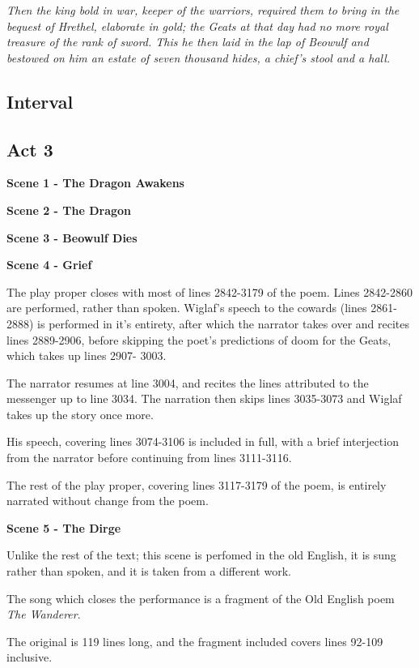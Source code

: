 \documentclass[a4paper]{article}
\begin{document}
{\textit{ Then the king bold in war, keeper of the warriors,
required them to bring in the bequest of Hrethel,
elaborate in gold; the Geats at that day
had no more royal treasure of the rank of sword.
This he then laid in the lap of Beowulf
and bestowed on him an estate of seven thousand hides,
a chief’s stool and a hall.}

\subsection{Interval}%

\subsection{Act 3}%

\centerline{\textbf{Scene 1 - The Dragon Awakens}}

\centerline{\textbf{Scene 2 - The Dragon}}

\centerline{\textbf{Scene 3 - Beowulf Dies}}

\centerline{\textbf{Scene 4 - Grief}}

The play proper closes with most of lines 2842-3179 of the poem.
Lines 2842-2860 are performed, rather than spoken.  
Wiglaf's speech to the cowards (lines 2861-2888) is performed in it's entirety, 
after which the narrator takes over and recites lines 2889-2906, before skipping 
the poet's predictions of doom for the Geats, which takes up lines 2907- 3003.

The narrator resumes at line 3004, and recites the lines attributed to the 
messenger up to line 3034. The narration then skips lines 3035-3073 and Wiglaf takes up 
the story once more.

His speech, covering lines 3074-3106 is included in full, with a brief interjection
from the narrator before continuing from lines 3111-3116.

The rest of the play proper, covering lines 3117-3179 of the poem, is entirely 
narrated without change from the poem.

\centerline{\textbf{Scene 5 - The Dirge}}

Unlike the rest of the text; this scene is perfomed in the old English, it is sung 
rather than spoken, and it is taken from a different work.

The song which closes the performance is a fragment of the Old English poem \textit{The Wanderer}.

The original is 119 lines long, and the fragment included covers lines 92-109 inclusive.

}
\end{document}
